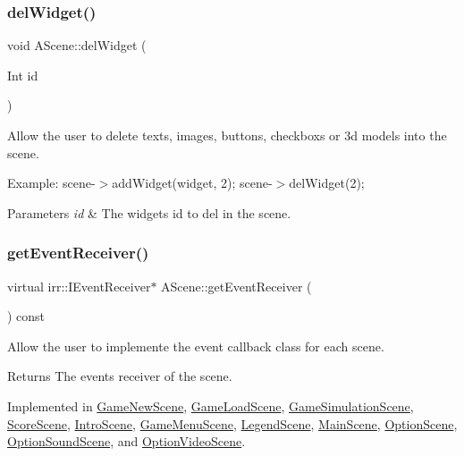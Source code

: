 \subsubsection{\texorpdfstring{del\+Widget()}{delWidget()}}
{\footnotesize\ttfamily void A\+Scene\+::del\+Widget (\begin{DoxyParamCaption}\item[{Int}]{id }\end{DoxyParamCaption})}



Allow the user to delete texts, images, buttons, checkboxs or 3d models into the scene. 

Example\+: scene-\/$>$add\+Widget(widget, 2); scene-\/$>$del\+Widget(2);


\begin{DoxyParams}{Parameters}
{\em id} & The widget\textquotesingle{}s id to del in the scene. \\
\hline
\end{DoxyParams}
\mbox{\label{classAScene_af521e5e6d30a5d2e5d30eb333e4d3abd}} 
\subsubsection{\texorpdfstring{get\+Event\+Receiver()}{getEventReceiver()}}
{\footnotesize\ttfamily virtual irr\+::\+I\+Event\+Receiver$\ast$ A\+Scene\+::get\+Event\+Receiver (\begin{DoxyParamCaption}{ }\end{DoxyParamCaption}) const\hspace{0.3cm}{\ttfamily [pure virtual]}}



Allow the user to implemente the event callback class for each scene. 

\begin{DoxyReturn}{Returns}
The events\textquotesingle{} receiver of the scene. 
\end{DoxyReturn}


Implemented in \hyperlink{classGameNewScene_a21c27ef3ea1923d975683e1bcdd134fa}{Game\+New\+Scene}, \hyperlink{classGameLoadScene_a81807790ad65bd2cf97a1e543cae2b74}{Game\+Load\+Scene}, \hyperlink{classGameSimulationScene_a048b2a937caff3af7b4d54f8bd404ec1}{Game\+Simulation\+Scene}, \hyperlink{classScoreScene_ae398ba58a33b3605a0c71265202534e2}{Score\+Scene}, \hyperlink{classIntroScene_acabf925dab7b2a346edd398445cd5800}{Intro\+Scene}, \hyperlink{classGameMenuScene_adcb01430b24486c4e5d0157fc32d7611}{Game\+Menu\+Scene}, \hyperlink{classLegendScene_ab11340ae844c04d704f28e1ef188deae}{Legend\+Scene}, \hyperlink{classMainScene_af9fbc6337aa6ff42447c702e91e77237}{Main\+Scene}, \hyperlink{classOptionScene_a8848b9040ee7fd9c1d05a22181c5e053}{Option\+Scene}, \hyperlink{classOptionSoundScene_ac71da65763f0db4b05fc32444308b677}{Option\+Sound\+Scene}, and \hyperlink{classOptionVideoScene_a84625e871c5176d7abc77a7f12c1472a}{Option\+Video\+Scene}.

